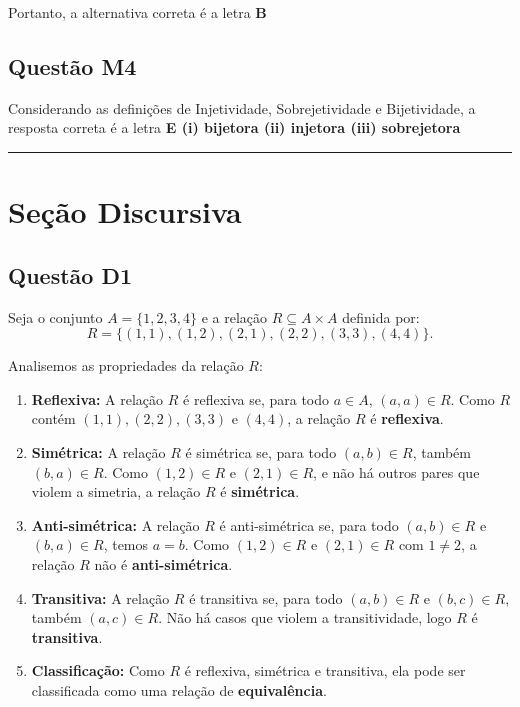 \documentclass{article}
\begin{document}
Portanto, a alternativa correta é a letra \textbf{B}
\subsection{Questão M4}

Considerando as definições de Injetividade, Sobrejetividade e Bijetividade, a resposta correta é a letra \textbf{E (i) bijetora (ii) injetora (iii) sobrejetora}


\vspace{0.5em}
\hrule
\vspace{0.5em}

\section{Seção Discursiva}

\subsection{Questão D1}
Seja o conjunto \( A = \{1, 2, 3, 4\} \) e a relação \( R \subseteq A \times A \) definida por:
\[
R = \{(1, 1), (1, 2), (2, 1), (2, 2), (3, 3), (4, 4)\}.
\]

Analisemos as propriedades da relação \(R\):

\begin{enumerate}
    \item \textbf{Reflexiva:}  
    A relação \(R\) é reflexiva se, para todo \(a \in A\), \((a, a) \in R\).  
    Como \(R\) contém \((1, 1), (2, 2), (3, 3)\) e \((4, 4)\), a relação \(R\) é \textbf{reflexiva}.

    \item \textbf{Simétrica:}  
    A relação \(R\) é simétrica se, para todo \((a, b) \in R\), também \((b, a) \in R\).  
    Como \((1, 2) \in R\) e \((2, 1) \in R\), e não há outros pares que violem a simetria, a relação \(R\) é \textbf{simétrica}.

    \item \textbf{Anti-simétrica:}  
    A relação \(R\) é anti-simétrica se, para todo \((a, b) \in R\) e \((b, a) \in R\), temos \(a = b\).  
    Como \((1, 2) \in R\) e \((2, 1) \in R\) com \(1 \neq 2\), a relação \(R\) não é \textbf{anti-simétrica}.

    \item \textbf{Transitiva:}  
    A relação \(R\) é transitiva se, para todo \((a, b) \in R\) e \((b, c) \in R\), também \((a, c) \in R\).  
    Não há casos que violem a transitividade, logo \(R\) é \textbf{transitiva}.

    \item \textbf{Classificação:}  
    Como \(R\) é reflexiva, simétrica e transitiva, ela pode ser classificada como uma relação de \textbf{equivalência}.
\end{enumerate}
\end{document}
